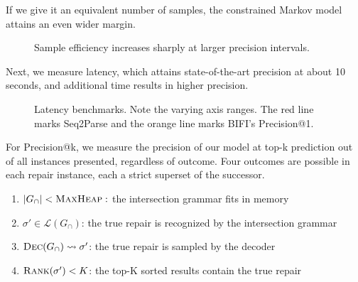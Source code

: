 If we give it an equivalent number of samples, the constrained Markov model attains an even wider margin.

\begin{figure}[H]
  \resizebox{.24\textwidth}{!}{}
  \resizebox{.24\textwidth}{!}{}
  \resizebox{.24\textwidth}{!}{}
  \resizebox{.24\textwidth}{!}{}
  \caption{Sample efficiency increases sharply at larger precision intervals.}
\end{figure}

Next, we measure latency, which attains state-of-the-art precision at about 10 seconds, and additional time results in higher precision.

\begin{figure}[H]
  \begin{center}
  \resizebox{.24\textwidth}{!}{}
  \resizebox{.24\textwidth}{!}{}
  \resizebox{.24\textwidth}{!}{}
  \end{center}
  \caption{Latency benchmarks. Note the varying axis ranges. The red line marks Seq2Parse and the orange line marks BIFI's Precision@1.}\label{fig:human}
\end{figure}

\noindent For Precision@k, we measure the precision of our model at top-k prediction out of all instances presented, regardless of outcome. Four outcomes are possible in each repair instance, each a strict superset of the successor.

\begin{enumerate}
  \item $|G_\cap| < \textsc{MaxHeap}:$ the intersection grammar fits in memory
  \item $\sigma' \in \mathcal{L}(G_\cap)$: the true repair is recognized by the intersection grammar
  \item $\textsc{Dec}(G_\cap) \rightsquigarrow \sigma'$: the true repair is sampled by the decoder
  \item $\textsc{Rank}(\sigma') < K$: the top-K sorted results contain the true repair
\end{enumerate}

